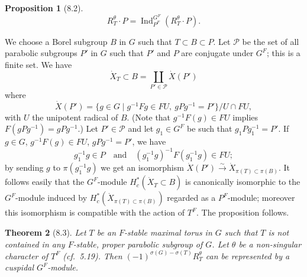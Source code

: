 \documentclass[11pt]{amsart}
\theoremstyle{plain}
\newtheorem{theorem}{Theorem}[section]
\newtheorem{proposition}[theorem]{Proposition}
\theoremstyle{remark}
\DeclareMathOperator{\Ind}{Ind}
\begin{document}
\begin{proposition}[8.2]
\[
R_T^\theta \cdot P = \Ind_{P^F}^{G^F}(R_T^\theta \cdot P).
\]
\end{proposition}

We choose a Borel subgroup $B$ in $G$ such that $T \subset B \subset P$. Let $\mathcal{P}$ be the set of all parabolic subgroups $P'$ in $G$ such that $P'$ and $P$ are conjugate under $G^F$; this is a finite set. We have
\[
\dot{X}_T \subset B = \coprod_{P' \in \mathcal{P}} \dot{X}(P')
\]
where
\[
\dot{X}(P') = \{g \in G \mid g^{-1}Fg \in FU, \ gPg^{-1} = P'\}/U \cap FU,
\]
with $U$ the unipotent radical of $B$. (Note that $g^{-1}F(g) \in FU$ implies $F(gPg^{-1}) = gPg^{-1}$.) Let $P' \in \mathcal{P}$ and let $g_1 \in G^F$ be such that $g_1Pg_1^{-1} = P'$. If $g \in G$, $g^{-1}F(g) \in FU$, $gPg^{-1} = P'$, we have
\[
g_1^{-1}g \in P \quad \text{and} \quad (g_1^{-1}g)^{-1}F(g_1^{-1}g) \in FU;
\]
by sending $g$ to $\pi(g_1^{-1}g)$ we get an isomorphism $\dot{X}(P') \xrightarrow{\sim} \dot{X}_{\pi(T) \subset \pi(B)}$. It follows easily that the $G^F$-module $H_c^*(\dot{X}_T \subset B)$ is canonically isomorphic to the $G^F$-module induced by $H_c^*(\dot{X}_{\pi(T) \subset \pi(B)})$ regarded as a $P^F$-module; moreover this isomorphism is compatible with the action of $T^F$. The proposition follows.

\begin{theorem}[8.3]
Let $T$ be an $F$-stable maximal torus in $G$ such that $T$ is not contained in any $F$-stable, proper parabolic subgroup of $G$. Let $\theta$ be a non-singular character of $T^F$ (cf.\ 5.19). Then $(-1)^{\sigma(G) - \sigma(T)} R_T^\theta$ can be represented by a cuspidal $G^F$-module.
\end{theorem}
\end{document}
